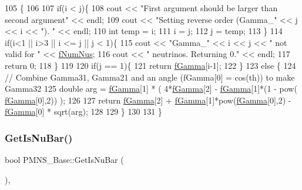 \begin{DoxyCode}
105 \{
106 
107   \textcolor{keywordflow}{if}(i < j)\{
108     cout << \textcolor{stringliteral}{"First argument should be larger than second argument"} << endl;
109     cout << \textcolor{stringliteral}{"Setting reverse order (Gamma\_"} << j << i << \textcolor{stringliteral}{"). "} << endl;
110     \textcolor{keywordtype}{int} temp = i;
111     i = j;
112     j = temp;
113   \}
114   \textcolor{keywordflow}{if}(i<1 || i>3 || i <= j || j < 1)\{
115     cout << \textcolor{stringliteral}{"Gamma\_"} << i << j << \textcolor{stringliteral}{" not valid for "} << \hyperlink{classOscProb_1_1PMNS__Base_a24bb74bed63569dfe88b18fa6a08060e}{fNumNus};
116     cout << \textcolor{stringliteral}{" neutrinos. Returning 0."} << endl;
117     \textcolor{keywordflow}{return} 0;
118   \}
119 
120   \textcolor{keywordflow}{if}(j == 1)\{ 
121     \textcolor{keywordflow}{return} \hyperlink{classOscProb_1_1PMNS__Deco_ae2f30ac9f8b25344959f1698616d337a}{fGamma}[i-1];
122   \}
123   \textcolor{keywordflow}{else} \{
124     \textcolor{comment}{// Combine Gamma31, Gamma21 and an angle (fGamma[0] = cos(th)) to make Gamma32}
125     \textcolor{keywordtype}{double} arg = \hyperlink{classOscProb_1_1PMNS__Deco_ae2f30ac9f8b25344959f1698616d337a}{fGamma}[1] * ( 4*\hyperlink{classOscProb_1_1PMNS__Deco_ae2f30ac9f8b25344959f1698616d337a}{fGamma}[2] - \hyperlink{classOscProb_1_1PMNS__Deco_ae2f30ac9f8b25344959f1698616d337a}{fGamma}[1]*(1 - pow(
      \hyperlink{classOscProb_1_1PMNS__Deco_ae2f30ac9f8b25344959f1698616d337a}{fGamma}[0],2)) );
126 
127     \textcolor{keywordflow}{return} \hyperlink{classOscProb_1_1PMNS__Deco_ae2f30ac9f8b25344959f1698616d337a}{fGamma}[2] + \hyperlink{classOscProb_1_1PMNS__Deco_ae2f30ac9f8b25344959f1698616d337a}{fGamma}[1]*pow(\hyperlink{classOscProb_1_1PMNS__Deco_ae2f30ac9f8b25344959f1698616d337a}{fGamma}[0],2) - \hyperlink{classOscProb_1_1PMNS__Deco_ae2f30ac9f8b25344959f1698616d337a}{fGamma}[0] * sqrt(arg);
128 
129   \}
130 
131 \}
\end{DoxyCode}
\mbox{\label{classOscProb_1_1PMNS__Base_a2f7f2a028dfe7a90fff6b4f757972c2c}} 
\subsubsection{\texorpdfstring{Get\+Is\+Nu\+Bar()}{GetIsNuBar()}}
{\footnotesize\ttfamily bool P\+M\+N\+S\+\_\+\+Base\+::\+Get\+Is\+Nu\+Bar (\begin{DoxyParamCaption}{ }\end{DoxyParamCaption})\hspace{0.3cm}{\ttfamily [virtual]}, {\ttfamily [inherited]}}

